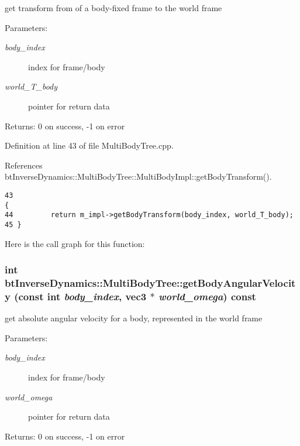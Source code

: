 get transform from of a body-fixed frame to the world frame \begin{Desc}
\item[Parameters:]
\begin{description}
\item[{\em body\_\-index}]index for frame/body \item[{\em world\_\-T\_\-body}]pointer for return data \end{description}
\end{Desc}
\begin{Desc}
\item[Returns:]0 on success, -1 on error \end{Desc}


Definition at line 43 of file MultiBodyTree.cpp.

References btInverseDynamics::MultiBodyTree::MultiBodyImpl::getBodyTransform().

\begin{Code}\begin{verbatim}43                                                                                    {
44         return m_impl->getBodyTransform(body_index, world_T_body);
45 }
\end{verbatim}
\end{Code}




Here is the call graph for this function:\hypertarget{classbt_inverse_dynamics_1_1_multi_body_tree_441236989196e2c5f7219f420ddc6620}{
\subsubsection[getBodyAngularVelocity]{\setlength{\rightskip}{0pt plus 5cm}int btInverseDynamics::MultiBodyTree::getBodyAngularVelocity (const int {\em body\_\-index}, \/  {\bf vec3} $\ast$ {\em world\_\-omega}) const}}
\label{classbt_inverse_dynamics_1_1_multi_body_tree_441236989196e2c5f7219f420ddc6620}


get absolute angular velocity for a body, represented in the world frame \begin{Desc}
\item[Parameters:]
\begin{description}
\item[{\em body\_\-index}]index for frame/body \item[{\em world\_\-omega}]pointer for return data \end{description}
\end{Desc}
\begin{Desc}
\item[Returns:]0 on success, -1 on error \end{Desc}


